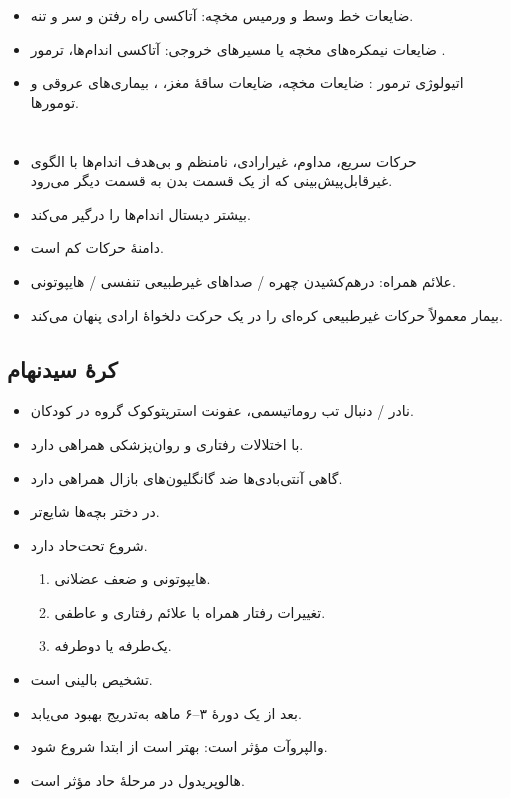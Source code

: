\documentclass[a4paper,12pt]{extbook}
\begin{document}
\begin{itemize}
\item ضایعات خط وسط و ورمیس مخچه: آتاکسی راه رفتن و  سر و تنه.
\item ضایعات نیمکره‌های مخچه یا مسیرهای خروجی: آتاکسی اندام‌ها، ترمور .
\item اتیولوژی ترمور : ضایعات مخچه، ضایعات ساقهٔ مغز، ، بیماری‌های عروقی و تومورها.
\end{itemize}
\section*{}
\begin{itemize}
\item حرکات سریع، مداوم، غیرارادی، نامنظم و بی‌هدف اندام‌ها با الگوی غیرقابل‌پیش‌بینی که از یک قسمت بدن به قسمت دیگر می‌رود.
\item بیشتر دیستال اندام‌ها را درگیر می‌کند.
\item دامنهٔ حرکات کم است.
\item علائم همراه: درهم‌کشیدن چهره / صداهای غیرطبیعی تنفسی / هایپوتونی.
\item بیمار معمولاً حرکات غیرطبیعی کره‌ای را در یک حرکت دلخواهٔ ارادی پنهان می‌کند.
\end{itemize}
\subsection*{کرهٔ سیدنهام}
\begin{itemize}
\item نادر / دنبال تب روماتیسمی، عفونت استرپتوکوک گروه  در کودکان.
\item با اختلالات رفتاری و روان‌پزشکی همراهی دارد.
\item گاهی آنتی‌بادی‌ها ضد گانگلیون‌های بازال همراهی دارد.
\item در دختر بچه‌ها شایع‌تر.
\item شروع تحت‌حاد دارد.
\begin{enumerate}[label=\alph*)]
\item هایپوتونی و ضعف عضلانی.
\item تغییرات رفتار همراه با علائم رفتاری و عاطفی.
\item یک‌طرفه یا دوطرفه.
\end{enumerate}
\item تشخیص بالینی است.
\item بعد از یک دورهٔ ۳–۶ ماهه به‌تدریج بهبود می‌یابد.
\item والپروآت مؤثر است: بهتر است از ابتدا شروع شود.
\item هالوپریدول در مرحلهٔ حاد مؤثر است.
\end{itemize}
\end{document}
